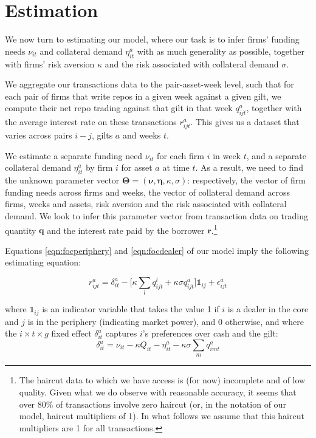 \section{Estimation}\label{sec:estimation}

We now turn to estimating our model, where our task is to infer firms' funding needs $\nu_{it}$ and collateral demand $\eta_{it}^a$ with as much generality as possible, together with firms' risk aversion $\kappa$ and the risk associated with collateral demand $\sigma$.

We aggregate our transactions data to the pair-asset-week level, such that for each pair of firms that write repos in a given week against a given gilt, we compute their net repo trading against that gilt in that week $q_{ijt}^a$, together with the average interest rate on these transactions $r_{ijt}^a$. This gives us a dataset that varies across pairs $i-j$, gilts $a$ and weeks $t$. 

We estimate a separate funding need $\nu_{it}$ for each firm $i$ in week $t$, and a separate collateral demand $\eta^a_{it}$ by firm $i$ for asset $a$ at time $t$. As a result, we need to find the unknown parameter vector $\mathbf{\Theta}=(\bm{\nu}, \bm{\eta}, \kappa, \sigma)$: respectively, the vector of firm funding needs across firms and weeks, the vector of  collateral demand across firms, weeks and assets, risk aversion and the risk associated with collateral demand. We look to infer this parameter vector from transaction data on trading quantity $\mathbf{q}$ and the interest rate paid by the borrower $\mathbf{r}$.\footnote{The haircut data to which we have access is (for now) incomplete and of low quality. Given what we do observe with reasonable accuracy, it seems that over 80\% of transactions involve zero haircut (or, in the notation of our model, haircut multipliers of 1). In what follows we assume that this haircut multipliers are 1 for all transactions.}

Equations \ref{eqn:focperiphery} and \ref{eqn:focdealer} of our model imply the following estimating equation:

\begin{equation}\label{eqn:estimating}
    r^a_{ijt}=\delta^a_{it}-\bigg[ \kappa \sum_l q^l_{ijt}+\kappa \sigma q^a_{ijt} \bigg] \mathds{1}_{ij}+\epsilon^a_{ijt}
\end{equation}

\noindent where $\mathds{1}_{ij}$ is an indicator variable that takes the value 1 if $i$ is a dealer in the core and $j$ is in the periphery (indicating market power), and 0 otherwise, and where the $i \times t \times g$ fixed effect $\delta^a_{it}$ captures $i$'s preferences over cash and the gilt:
\begin{equation}\label{eqn:fixedEffectReg}
    \delta^a_{it}=\nu_{it}-\kappa Q_{it}-\eta^a_{it}-\kappa \sigma \sum_m q^a_{imt}
\end{equation}

